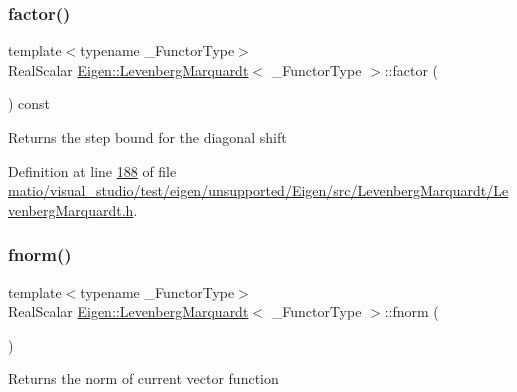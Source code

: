 \subsubsection{\texorpdfstring{factor()}{factor()}\hspace{0.1cm}{\footnotesize\ttfamily [2/2]}}
{\footnotesize\ttfamily template$<$typename \+\_\+\+Functor\+Type$>$ \\
Real\+Scalar \hyperlink{class_eigen_1_1_levenberg_marquardt}{Eigen\+::\+Levenberg\+Marquardt}$<$ \+\_\+\+Functor\+Type $>$\+::factor (\begin{DoxyParamCaption}{ }\end{DoxyParamCaption}) const\hspace{0.3cm}{\ttfamily [inline]}}

\begin{DoxyReturn}{Returns}
the step bound for the diagonal shift 
\end{DoxyReturn}


Definition at line \hyperlink{matio_2visual__studio_2test_2eigen_2unsupported_2_eigen_2src_2_levenberg_marquardt_2_levenberg_marquardt_8h_source_l00188}{188} of file \hyperlink{matio_2visual__studio_2test_2eigen_2unsupported_2_eigen_2src_2_levenberg_marquardt_2_levenberg_marquardt_8h_source}{matio/visual\+\_\+studio/test/eigen/unsupported/\+Eigen/src/\+Levenberg\+Marquardt/\+Levenberg\+Marquardt.\+h}.

\mbox{\label{class_eigen_1_1_levenberg_marquardt_ac30c5ce96ac91663b287b2ba7ec7c712}} 
\subsubsection{\texorpdfstring{fnorm()}{fnorm()}\hspace{0.1cm}{\footnotesize\ttfamily [1/2]}}
{\footnotesize\ttfamily template$<$typename \+\_\+\+Functor\+Type$>$ \\
Real\+Scalar \hyperlink{class_eigen_1_1_levenberg_marquardt}{Eigen\+::\+Levenberg\+Marquardt}$<$ \+\_\+\+Functor\+Type $>$\+::fnorm (\begin{DoxyParamCaption}{ }\end{DoxyParamCaption})\hspace{0.3cm}{\ttfamily [inline]}}

\begin{DoxyReturn}{Returns}
the norm of current vector function 
\end{DoxyReturn}


